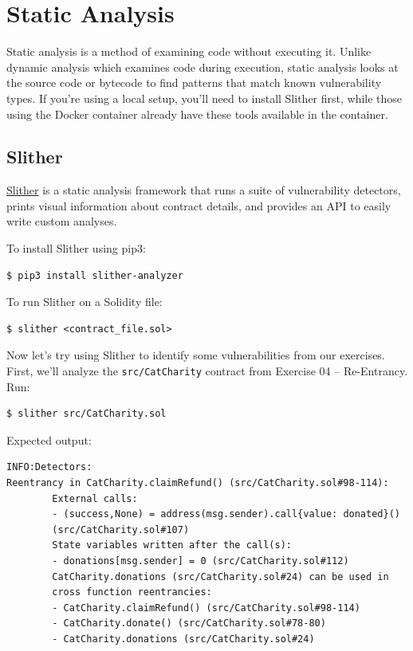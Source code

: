 \documentclass[12pt]{article}
\begin{document}
\section{Static Analysis}

Static analysis is a method of examining code without executing it. Unlike
dynamic analysis which examines code during execution, static analysis looks
at the source code or bytecode to find patterns that match known vulnerability
types. If you're using a local setup, you'll need to install Slither first,
while those using the Docker container already have these tools available in
the container.

\subsection*{Slither}

\href{https://github.com/crytic/slither}{Slither} is a static analysis framework that runs a suite of vulnerability detectors, prints visual information about contract details, and provides an API to easily write custom analyses.

\medskip
\noindent
To install Slither using pip3:

\noindent \begin{minipage}{\textwidth}
    \begin{verbatim}
$ pip3 install slither-analyzer
\end{verbatim}
\end{minipage}

\medskip
\noindent
To run Slither on a Solidity file:

\begin{verbatim}
$ slither <contract_file.sol>
\end{verbatim}

\noindent
Now let's try using Slither to identify some vulnerabilities from our exercises. First, we'll analyze the \texttt{src/CatCharity} contract from Exercise 04 -- Re-Entrancy. Run:

\begin{verbatim}
$ slither src/CatCharity.sol
\end{verbatim}

\noindent
Expected output:
\begin{verbatim}
INFO:Detectors:
Reentrancy in CatCharity.claimRefund() (src/CatCharity.sol#98-114):
        External calls:
        - (success,None) = address(msg.sender).call{value: donated}() 
        (src/CatCharity.sol#107)
        State variables written after the call(s):
        - donations[msg.sender] = 0 (src/CatCharity.sol#112)
        CatCharity.donations (src/CatCharity.sol#24) can be used in 
        cross function reentrancies:
        - CatCharity.claimRefund() (src/CatCharity.sol#98-114)
        - CatCharity.donate() (src/CatCharity.sol#78-80)
        - CatCharity.donations (src/CatCharity.sol#24)
\end{verbatim}
\end{document}
